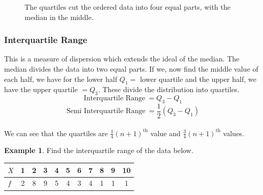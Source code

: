 \documentclass[11pt,a4paper]{article}
\theoremstyle{definition}
\newtheorem{example}[thm]{Example}
\begin{document}



\begin{figure}[H]
\centering
{}
\caption{The quartiles cut the ordered data into four equal parts, with the median in the middle.}
\end{figure}








\vspace{0.3cm}
\subsubsection{Interquartile Range}
This is a measure of dispersion which extends the ideal of the median. The median divides the data into two equal parts. If we, now find the middle value of each half, we have for the lower half $Q_1=$ lower quartile and the upper half, we have the upper quartile $=Q_3$. These divide the distribution into quartiles.\[\text{Interquartile Range}\ =Q_3-Q_1\] \[\text{Semi Interquartile Range}\ =\frac{1}{2}(Q_3-Q_1)\]\\
We can see that the quartiles are $\frac{1}{4}(n+1)^{\text{th}}$ value and $\frac{3}{4}(n+1)^{\text{th}}$ values.\\[1ex]

\begin{example}
Find the interquartile range of the data below.
\begin{table}[H]
\centering
\begin{tabular}{lcccccccccc}
$X$ & 1 & 2 & 3 & 4 & 5 & 6 & 7 & 8 & 9 & 10\\
\hline
$f$ & 2 & 8 & 9 & 5 & 4 & 3 & 4 & 1 & 1 & 1\\
\end{tabular}
\end{table}
\end{example}
\end{document}
